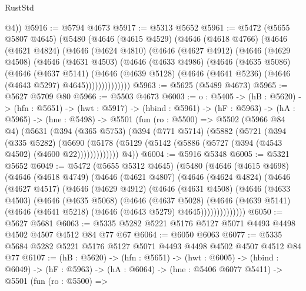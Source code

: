 \begin{lexlean}{RustStd}
\begin{coremodule}
{\begin{coremodule}
{{{{{{{{        @4))
@5916 := @5794 @4673
@5917 := @5313 @5652
@5961 := @5472
    (@5655 @5807 @4645)
    (@5480
      (@4646
        (@4615 @4529)
        (@4646
          (@4618 @4766)
          (@4646
            (@4621 @4824)
            (@4646
              (@4624 @4810)
              (@4646
                (@4627 @4912)
                (@4646
                  (@4629 @4508)
                  (@4646
                    (@4631 @4503)
                    (@4646
                      (@4633 @4986)
                      (@4646
                        (@4635 @5086)
                        (@4646
                          (@4637 @5141)
                          (@4646
                            (@4639 @5128)
                            (@4646 (@4641 @5236) (@4646 (@4643 @5297) @4645))))))))))))))
@5963 := @5625 (@5489 @4673)
@5965 := @5627 @5709 @80
@5966 := @5503 @4673
@6003 := {o : @5405} ->
  (hB : @5620) ->
  (hfn : @5651) ->
  (hwt : @5917) ->
  (hbind : @5961) ->
  (hF : @5963) ->
  (hA : @5965) ->
  (hne : @5498) ->
  @5501
    (fun (ro : @5500) =>
    @5502
      (@5966 @84 @4)
      (@5631
        (@394
          (@365 @5753)
          (@394
            (@771 @5714)
            (@5882
              (@5721
                (@394
                  (@335 @5282)
                  (@5690
                    (@5178 (@5129 (@5142 (@5886 (@5727 (@394 (@4543 @4502) (@4600 @22)))))))))))))
        @4))
@6004 := @5916 @5348
@6005 := @5321 @5652
@6049 := @5472
    (@5655 @5312 @4645)
    (@5480
      (@4646
        (@4615 @4698)
        (@4646
          (@4618 @4749)
          (@4646
            (@4621 @4807)
            (@4646
              (@4624 @4824)
              (@4646
                (@4627 @4517)
                (@4646
                  (@4629 @4912)
                  (@4646
                    (@4631 @4508)
                    (@4646
                      (@4633 @4503)
                      (@4646
                        (@4635 @5068)
                        (@4646
                          (@4637 @5028)
                          (@4646
                            (@4639 @5141)
                            (@4646 (@4641 @5218) (@4646 (@4643 @5279) @4645))))))))))))))
@6050 := @5627 @5681
@6063 := @5335 @5282 @5221 @5176 @5127 @5071 @4493 @4498 @4502 @4507 @4512 @84 @77 @67
@6064 := @6050 @6063
@6077 := @5335 @5684 @5282 @5221 @5176 @5127 @5071 @4493 @4498 @4502 @4507 @4512 @84 @77
@6107 := (hB : @5620) ->
  (hfn : @5651) ->
  (hwt : @6005) ->
  (hbind : @6049) ->
  (hF : @5963) ->
  (hA : @6064) ->
  (hne : @5406 @6077 @5411) ->
  @5501
    (fun (ro : @5500) =>
}}}}}}}}
\end{coremodule}}
\end{coremodule}
\end{lexlean}
